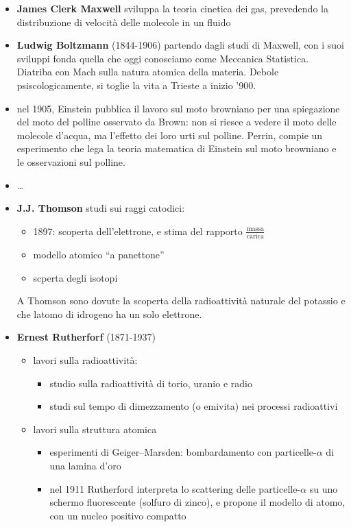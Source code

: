 \begin{itemize}
    \item \textbf{James Clerk Maxwell} sviluppa la teoria cinetica dei gas, prevedendo la distribuzione di velocità delle molecole in un fluido
    \item \textbf{Ludwig Boltzmann} (1844-1906) partendo dagli studi di Maxwell, con i suoi sviluppi fonda quella che oggi conosciamo come Meccanica Statistica. Diatriba con Mach sulla natura atomica della materia. Debole psiscologicamente, si toglie la vita a Trieste a inizio '900.
    \item nel 1905, Einstein pubblica il lavoro sul moto browniano per una spiegazione del moto del polline osservato da Brown: non si riesce a vedere il moto delle molecole d'acqua, ma l'effetto dei loro urti sul polline. Perrin, compie un esperimento che lega la teoria matematica di Einstein sul moto browniano e le osservazioni sul polline.
    \item \dots
    \item \textbf{J.J. Thomson} studi sui raggi catodici:
        \begin{itemize}
             \item 1897: scoperta dell'elettrone, e stima del rapporto $\frac{\text{massa}}{\text{carica}}$
             \item modello atomico ``a panettone''
             \item scperta degli isotopi
        \end{itemize}
        A Thomson sono dovute la scoperta della radioattività naturale del potassio e che latomo di idrogeno ha un solo elettrone.
    \item \textbf{Ernest Rutherforf} (1871-1937)
        \begin{itemize}
            \item lavori sulla radioattività:
                \begin{itemize}
                    \item studio sulla radioattività di torio, uranio e radio
                    \item studi sul tempo di dimezzamento (o emivita) nei processi radioattivi
                \end{itemize}
            \item lavori sulla struttura atomica 
                \begin{itemize}
                    \item esperimenti di Geiger--Marsden: bombardamento con particelle-$\alpha$ di una lamina d'oro
                    \item nel 1911 Rutherford interpreta lo scattering delle particelle-$\alpha$ su uno schermo fluorescente (solfuro di zinco), e propone il modello di atomo, con un nucleo positivo compatto

\end{itemize}
\end{itemize}
\end{itemize}
